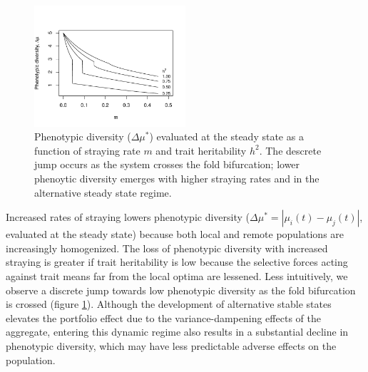 \documentclass[twocolumn,preprintnumbers,amsmath,amssymb,superscriptaddress]{revtex4}
\begin{document}
\begin{figure}
  \captionsetup{justification=raggedright,
singlelinecheck=false
}
\centering
\includegraphics[width=0.5\textwidth]{figs2/fig_traitdiff.pdf}
\caption{
Phenotypic diversity ($\Delta \mu^*$) evaluated at the steady state as a function of straying rate $m$ and trait heritability $h^2$. The descrete jump occurs as the system crosses the fold bifurcation; lower phenoytic diversity emerges with higher straying rates and in the alternative steady state regime. 
} \label{fig:traitdiff}
\end{figure}

Increased rates of straying lowers phenotypic diversity ($\Delta \mu^* = |\mu_i(t)-\mu_j(t)|$, evaluated at the steady state) because both local and remote populations are increasingly homogenized.
The loss of phenotypic diversity with increased straying is greater if trait heritability is low because the selective forces acting against trait means far from the local optima are lessened. %
Less intuitively, we observe a discrete jump towards low phenotypic diversity as the fold bifurcation is crossed (figure \ref{fig:traitdiff}).
Although the development of alternative stable states elevates the portfolio effect due to the variance-dampening effects of the aggregate, entering this dynamic regime also results in a substantial decline in phenotypic diversity, which may have less predictable adverse effects on the population. 
\\
\end{document}

